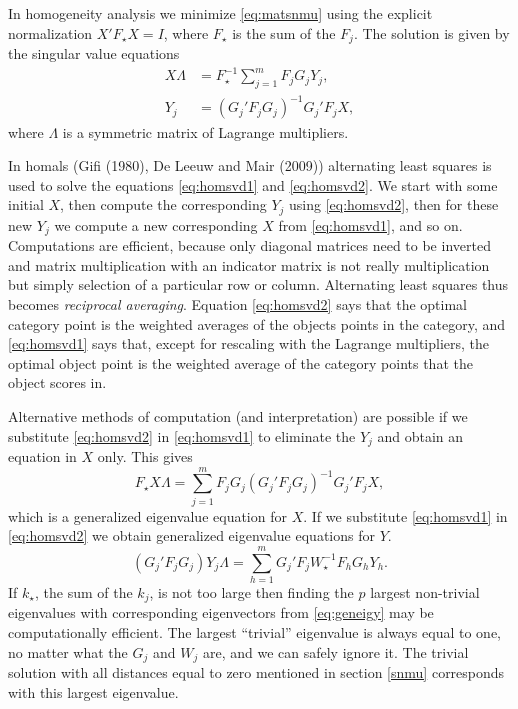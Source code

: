 \documentclass[
  12pt,
]{article}
\begin{document}
In homogeneity analysis we minimize \eqref{eq:matsnmu} using the
explicit normalization \(X'F_\star X=I\), where \(F_\star\) is the
sum of the \(F_j\). The solution is given by the singular value
equations
\begin{subequations}
\begin{align}
X\Lambda&=F_\star^{-1}\sum_{j=1}^m F_jG_jY_j,\label{eq:homsvd1}\\
Y_j&=(G_j'F_jG_j)^{-1}G_j'F_jX,\label{eq:homsvd2}
\end{align}
\end{subequations}
where \(\Lambda\) is a symmetric matrix of Lagrange multipliers.

In homals (Gifi (1980), De Leeuw and Mair (2009)) alternating least squares is used
to solve the equations \eqref{eq:homsvd1} and \eqref{eq:homsvd2}. We start with
some initial \(X\), then compute the corresponding \(Y_j\) using \eqref{eq:homsvd2},
then for these new \(Y_j\) we compute a new corresponding \(X\) from \eqref{eq:homsvd1},
and so on. Computations are efficient, because only diagonal matrices need to
be inverted and matrix multiplication with an indicator matrix is not really multiplication but simply selection of a particular row or column. Alternating least squares thus becomes \emph{reciprocal averaging}. Equation \eqref{eq:homsvd2} says that the optimal category
point is the weighted averages of the objects points in the category, and \eqref{eq:homsvd1}
says that, except for rescaling with the Lagrange multipliers, the optimal object
point is the weighted average of the category points that the object scores in.

Alternative methods of computation (and interpretation) are possible if we
substitute \eqref{eq:homsvd2} in \eqref{eq:homsvd1} to eliminate the \(Y_j\)
and obtain an equation in \(X\) only. This gives
\begin{equation}
F_\star X\Lambda=\sum_{j=1}^m F_jG_j(G_j'F_jG_j)^{-1}G_j'F_jX,
\label{eq:geneigx}
\end{equation}
which is a generalized eigenvalue equation for \(X\). If we substitute \eqref{eq:homsvd1}
in \eqref{eq:homsvd2} we obtain generalized eigenvalue equations for \(Y\).
\begin{equation}
(G_j'F_jG_j)Y_j\Lambda=\sum_{h=1}^m G_j'F_jW_\star^{-1}F_hG_hY_h.
\label{eq:geneigy}
\end{equation}
If \(k_\star\), the sum of the \(k_j\), is not too large then finding the \(p\) largest non-trivial eigenvalues with corresponding eigenvectors from \eqref{eq:geneigy} may be computationally efficient. The largest ``trivial'' eigenvalue is always equal to one, no matter what the \(G_j\) and \(W_j\) are, and we can safely ignore it. The trivial solution with all distances equal to zero mentioned in section \ref{snmu} corresponds with this largest eigenvalue.
\end{document}
